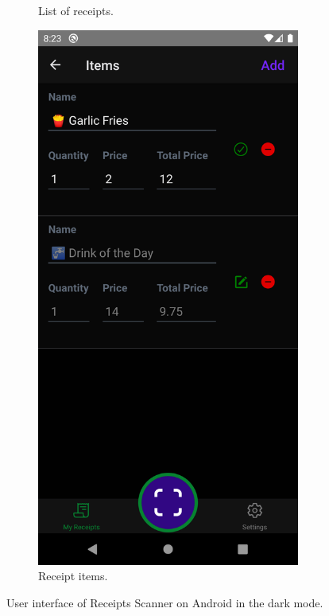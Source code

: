 \documentclass[
  printed, %
  table,   %
  oneside, %
  lof,     %
  lot,     %
]{fithesis3}
\newcommand\half{0.45}
\newcommand\subfigsize{0.95}
\begin{document}
\begin{figure}
\begin{subfigure}[t]{\half\textwidth}
      \caption{List of receipts.}
    \end{subfigure}
    \begin{subfigure}[t]{\half\textwidth}
      \centering
      \includegraphics[width=\subfigsize\textwidth]{figures/screens/android/dark/items}
      \caption{Receipt items.}
    \end{subfigure}
    \caption{User interface of Receipts Scanner on Android in the dark mode.}
    \label{fig:dark_mode_android}
\end{figure}
\end{document}
